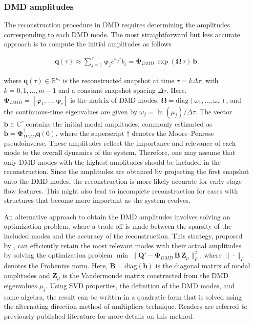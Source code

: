 \documentclass[a4paper,fleqn]{cas-sc}
\begin{document}
	\subsubsection{DMD amplitudes}
	\label{DMD amplitudes}
	
	The reconstruction procedure in DMD requires determining the amplitudes corresponding to each DMD mode. The most straightforward but less accurate approach is to compute the initial amplitudes as follows \cite{Kutz2016}
	
	\begin{align}
		\mathbf{q}(\tau)\approx \sum_{j=1}^{r} \boldsymbol{\varphi}_j e^{\omega_j \tau} b_j = \mathbf{\Phi}_{DMD}\,\exp (\mathbf{\Omega}\, \tau)\,\mathbf{b}.
		\label{eq 10}
	\end{align}
	
	\noindent where $\mathbf{q}(\tau)\in\mathbb{R}^{n_s}$ is the reconstructed snapshot at time $\tau=k\Delta\tau$, with $k=0,1,\ldots,m-1$ and a constant snapshot spacing $\Delta\tau$. Here, $\mathbf{\Phi}_{DMD}=[\boldsymbol{\varphi}_1,\ldots,\boldsymbol{\varphi}_r]$ is the matrix of DMD modes, $\mathbf{\Omega}=\mathrm{diag}(\omega_1,\ldots,\omega_r)$, and the continuous-time eigenvalues are given by $\omega_j=\ln(\mu_j)/\Delta\tau$. The vector $\mathbf{b}\in\mathbb{C}^{r}$ contains the initial modal amplitudes, commonly estimated as $\mathbf{b}=\mathbf{\Phi}_{DMD}^{\dagger}\mathbf{q}(0)$, where the superscript $\dagger$ denotes the Moore--Penrose pseudoinverse. These amplitudes reflect the importance and relevance of each mode to the overall dynamics of the system. Therefore, one may assume that only DMD modes with the highest amplitudes should be included in the reconstruction. Since the amplitudes are obtained by projecting the first snapshot onto the DMD modes, the reconstruction is more likely accurate for early-stage flow features. This might also lead to incomplete reconstruction for cases with structures that become more important as the system evolves. 
	
	An alternative approach to obtain the DMD amplitudes involves solving an optimization problem, where a trade-off is made between the sparsity of the included modes and the accuracy of the reconstruction. This strategy, proposed by \citet{Jovanovic2014}, can efficiently retain the most relevant modes with their actual amplitudes by solving the optimization problem $\min\,\|\mathbf{Q}' - \mathbf{\Phi}_{DMD}\, \mathbf{B}\, \mathbf{Z}_{\mu}\|_F^2$, where $\|\cdot\|_F$ denotes the Frobenius norm. Here, $\mathbf{B}=\mathrm{diag}(\mathbf{b})$ is the diagonal matrix of modal amplitudes and $\mathbf{Z}_{\mu}$ is the Vandermonde matrix constructed from the DMD eigenvalues $\mu_j$. Using SVD properties, the definition of the DMD modes, and some algebra, the result can be written in a quadratic form that is solved using the alternating direction method of multipliers technique. Readers are referred to previously published literature \cite{Jovanovic2014,Schmid2023} for more details on this method. 
	
\end{document}
